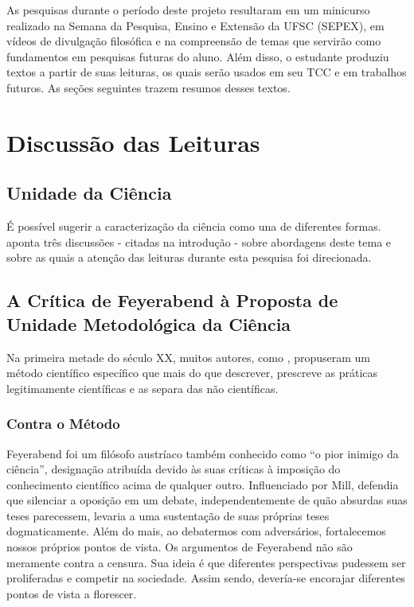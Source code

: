 \documentclass[12pt]{report}
\begin{document}
	As pesquisas durante o período deste projeto resultaram em um minicurso realizado na Semana da Pesquisa, Ensino e Extensão da UFSC (SEPEX), em vídeos de divulgação filosófica e na compreensão de temas que servirão como fundamentos em pesquisas futuras do aluno.
	Além disso, o estudante produziu textos a partir de suas leituras, os quais serão usados em seu TCC e em trabalhos futuros.
	As seções seguintes trazem resumos desses textos.
	
	\section{Discussão das Leituras}
	
	\subsection{Unidade da Ciência}
	
		É possível sugerir a caracterização da ciência como una de diferentes formas.
		\textcite{cunha-unidade} aponta três discussões - citadas na introdução - sobre abordagens deste tema e sobre as quais a atenção das leituras durante esta pesquisa foi direcionada.
		
	\subsection{A Crítica de Feyerabend à Proposta de Unidade Metodológica da Ciência}
		
		Na primeira metade do século XX, muitos autores, como \textcite{popper_conjeturas}, propuseram um método científico específico que mais do que descrever, prescreve as práticas legitimamente científicas e as separa das não científicas.
		
		\subsubsection{Contra o Método}
			
			Feyerabend foi um filósofo austríaco também conhecido como ``o pior inimigo da ciência'', designação atribuída devido às suas críticas à imposição do conhecimento científico acima de qualquer outro.
			Influenciado por Mill, defendia que silenciar a oposição em um debate, independentemente de quão absurdas suas teses parecessem, levaria a uma sustentação de suas próprias teses dogmaticamente.
			Além do mais, ao debatermos com adversários, fortalecemos nossos próprios pontos de vista.
			Os argumentos de Feyerabend não são meramente contra a censura.
			Sua ideia é que diferentes perspectivas pudessem ser proliferadas e competir na sociedade.
			Assim sendo, devería-se encorajar diferentes pontos de vista a florescer.
			
\end{document}
